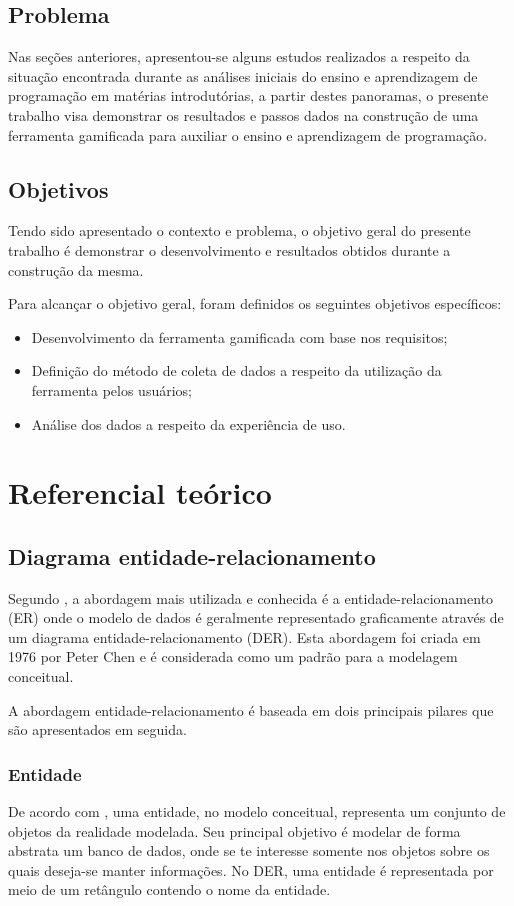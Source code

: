 \section{Problema}
Nas seções anteriores, apresentou-se alguns estudos realizados a respeito da situação encontrada durante as análises iniciais do ensino e aprendizagem
de programação em matérias introdutórias, a partir destes panoramas, o presente trabalho visa demonstrar os resultados e passos dados na construção de uma
ferramenta gamificada para auxiliar o ensino e aprendizagem de programação.
 
\section{Objetivos}
Tendo sido apresentado o contexto e problema, o objetivo geral do presente trabalho é demonstrar o desenvolvimento e resultados
obtidos durante a construção da mesma.

Para alcançar o objetivo geral, foram definidos os seguintes objetivos específicos:
\begin{itemize}
	\item Desenvolvimento da ferramenta gamificada com base nos requisitos;
	\item Definição do método de coleta de dados a respeito da utilização da ferramenta pelos usuários;
	\item Análise dos dados a respeito da experiência de uso.
\end{itemize}

\chapter{Referencial teórico}

\section{Diagrama entidade-relacionamento}
Segundo  , a abordagem mais utilizada e conhecida é a 
entidade-relacionamento (ER) onde o modelo de dados é geralmente representado graficamente através
de um diagrama entidade-relacionamento (DER). Esta abordagem foi criada em 1976 por Peter Chen e
é considerada como um padrão para a modelagem conceitual.

A abordagem entidade-relacionamento é baseada em dois principais pilares que são apresentados em seguida.

\subsection{Entidade}
De acordo com , uma entidade, no modelo conceitual, representa um conjunto
de objetos da realidade modelada. Seu principal objetivo é modelar de forma abstrata um banco de dados, onde
se te interesse somente nos objetos sobre os quais deseja-se manter informações. No DER, uma entidade é representada
por meio de um retângulo contendo o nome da entidade.
 
